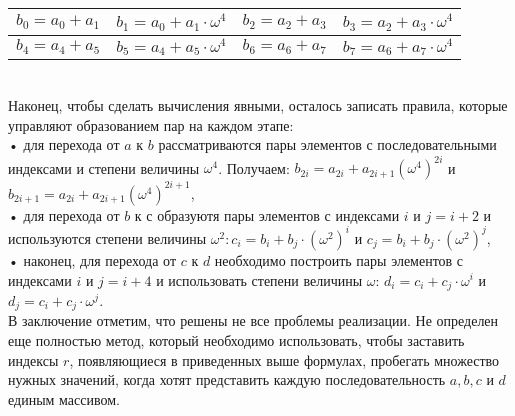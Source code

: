 \documentclass{mai_book}
\begin{document}
\begin{table}[h]
\begin{center}
\begin{tabular}{|c|c|c|c|}
\hline
$b_0=a_0+a_1$&$b_1=a_0+a_1 \cdot \omega^4$&$b_2=a_2+a_3$&$b_3=a_2+a_3 \cdot \omega^4$\\
\hline
$b_4=a_4+a_5$&$b_5=a_4+a_5 \cdot \omega^4$&$b_6=a_6+a_7$&$b_7=a_6+a_7 \cdot \omega^4$\\
\hline
\end{tabular}
\end{center}
\end{table}\\
Наконец, чтобы сделать вычисления явными, осталось записать 
правила, которые управляют образованием пар на каждом этапе:\\
• для перехода от $a$ к $b$ рассматриваются пары элементов с 
последовательными индексами и степени величины $\omega^4$. Получаем:
$b_{2i}=a_{2i}+a_{2i+1} ({\omega^4})^{2i}$ и $b_{2i+1}=a_{2i}+a_{2i+1} ({\omega^4})^{2i+1}$,\\
• для перехода от $b$ к с образуютя пары элементов с индексами $i$ и
$j = i+2$ и используются степени величины $\omega^2:c_i=b_i+b_j \cdot {(\omega^2)}^i$
и $c_j=b_i+b_j \cdot {(\omega^2)}^j$,\\
• наконец, для перехода от $c$ к $d$ необходимо построить пары 
элементов с индексами $i$ и $j = i+4$ и использовать степени величины $\omega$:
$d_i = c_i + c_j \cdot \omega^i$ и $d_j = c_i + c_j \cdot \omega^j$.\\
В заключение отметим, что решены не все проблемы реализации.
Не определен еще полностью метод, который необходимо использовать,
чтобы заставить индексы $r$, появляющиеся в приведенных выше 
формулах, пробегать множество нужных значений, когда хотят представить
каждую последовательность $a, b, c$ и $d$ единым массивом.
\end{document}
